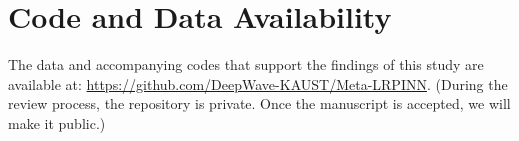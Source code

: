\section*{\textbf{Code and Data Availability}}
The data and accompanying codes that support the findings of this study are available at: 
\url{https://github.com/DeepWave-KAUST/Meta-LRPINN}. (During the review process, the repository is private. Once the manuscript is accepted, we will make it public.)
